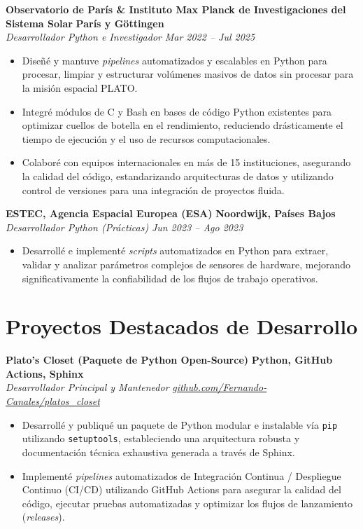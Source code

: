 \documentclass[10pt,a4paper]{article}
\begin{document}
\textbf{Observatorio de París \& Instituto Max Planck de Investigaciones del Sistema Solar} \hfill \textbf{París y Göttingen} \\
\textit{Desarrollador Python e Investigador} \hfill \textit{Mar 2022 -- Jul 2025}
\begin{itemize}[leftmargin=1.5em]
    \item Diseñé y mantuve \textit{pipelines} automatizados y escalables en Python para procesar, limpiar y estructurar volúmenes masivos de datos sin procesar para la misión espacial PLATO.
    \item Integré módulos de C y Bash en bases de código Python existentes para optimizar cuellos de botella en el rendimiento, reduciendo drásticamente el tiempo de ejecución y el uso de recursos computacionales.
    \item Colaboré con equipos internacionales en más de 15 instituciones, asegurando la calidad del código, estandarizando arquitecturas de datos y utilizando control de versiones para una integración de proyectos fluida.
\end{itemize}

\textbf{ESTEC, Agencia Espacial Europea (ESA)} \hfill \textbf{Noordwijk, Países Bajos}\\
\textit{Desarrollador Python (Prácticas)}  \hfill \textit{Jun 2023 -- Ago 2023}
\begin{itemize}[leftmargin=1.5em]
    \item Desarrollé e implementé \textit{scripts} automatizados en Python para extraer, validar y analizar parámetros complejos de sensores de hardware, mejorando significativamente la confiabilidad de los flujos de trabajo operativos.
\end{itemize}

\section*{Proyectos Destacados de Desarrollo}
\textbf{Plato's Closet (Paquete de Python Open-Source)} \hfill \textbf{Python, GitHub Actions, Sphinx} \\
\textit{Desarrollador Principal y Mantenedor} \hfill \textit{\href{https://github.com/Fernando-Canales/platos_closet}{github.com/Fernando-Canales/platos\_closet}}
\begin{itemize}[leftmargin=1.5em]
    \item Desarrollé y publiqué un paquete de Python modular e instalable vía \texttt{pip} utilizando \texttt{setuptools}, estableciendo una arquitectura robusta y documentación técnica exhaustiva generada a través de Sphinx.
    \item Implementé \textit{pipelines} automatizados de Integración Continua / Despliegue Continuo (CI/CD) utilizando GitHub Actions para asegurar la calidad del código, ejecutar pruebas automatizadas y optimizar los flujos de lanzamiento (\textit{releases}).
\end{itemize}
\end{document}
